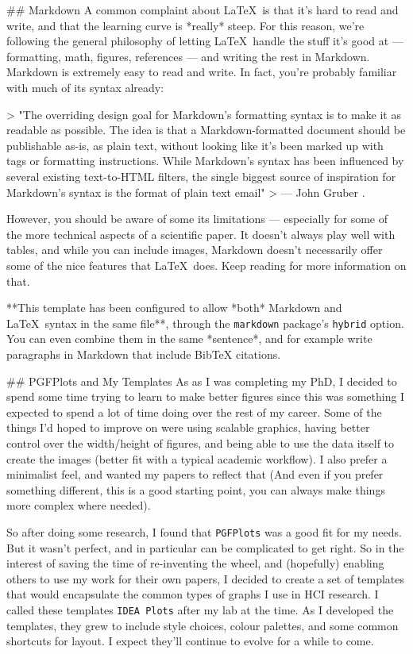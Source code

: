 \begin{markdown}
## Markdown
A common complaint about \LaTeX\ is that it's hard to read and write, and that the learning curve is *really* steep. For this reason, we're following the general philosophy of letting \LaTeX\ handle the stuff it's good at --- formatting, math, figures, references --- and writing the rest in Markdown. Markdown is extremely easy to read and write. In fact, you're probably familiar with much of its syntax already: 

>    "The overriding design goal for Markdown’s formatting syntax is to make it as readable as possible. The idea is that a Markdown-formatted document should be publishable as-is, as plain text, without looking like it’s been marked up with tags or formatting instructions. While Markdown’s syntax has been influenced by several existing text-to-HTML filters, the single biggest source of inspiration for Markdown’s syntax is the format of plain text email"
> --- John Gruber \citep{gruber2006}.

However, you should be aware of some its limitations --- especially for some of the more technical aspects of a scientific paper. It doesn't always play well with tables, and while you can include images, Markdown doesn't necessarily offer some of the nice features that \LaTeX\ does. Keep reading for more information on that. 

**This template has been configured to allow *both* Markdown and \LaTeX\ syntax in the same file**, through the \texttt{markdown} package's \texttt{hybrid} option. You can even combine them in the same *sentence*, and for example write paragraphs in Markdown that include BibTeX citations.



## PGFPlots and My Templates 
As as I was completing my PhD, I decided to spend some time trying to learn to make better figures since this was something I expected to spend a lot of time doing over the rest of my career. Some of the things I'd hoped to improve on were using scalable graphics, having better control over the width/height of figures, and being able to use the data itself to create the images (better fit with a typical academic workflow). I also prefer a minimalist feel, and wanted my papers to reflect that (And even if you prefer something different, this is a good starting point, you can always make things more complex where needed). 

So after doing some research, I found that \texttt{PGFPlots} was a good fit for my needs. But it wasn't perfect, and in particular can be complicated to get right. So in the interest of saving the time of re-inventing the wheel, and (hopefully) enabling others to use my work for their own papers, I decided to create a set of templates that would encapsulate the common types of graphs I use in HCI research. I called these templates \texttt{IDEA Plots} after my lab at the time. As I developed the templates, they grew to include style choices, colour palettes, and some common shortcuts for layout. I expect they'll continue to evolve for a while to come.  


\end{markdown}
